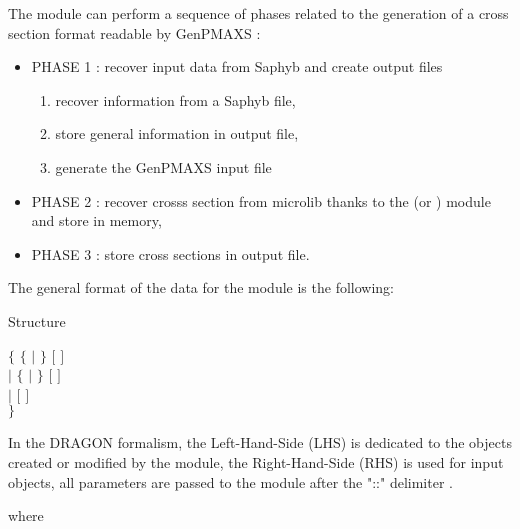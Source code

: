 The  module can perform a sequence of phases related to the generation of a cross section format readable by GenPMAXS :
\begin{itemize}
\item PHASE 1 : recover input data from Saphyb and create output files
\begin{enumerate}
\item recover information from a Saphyb file,
\item store general information in output file,
\item generate the GenPMAXS input file
\end{enumerate}
\item PHASE 2 : recover crosss section from microlib thanks to the  (or ) module and store in memory,
\item PHASE 3 : store cross sections in output file.
\end{itemize}


\noindent
The general format of the data for the  module is the following:

\begin{DataStructure}{Structure }

$\lbrace$
      $\lbrace$  $\vert$   $ \rbrace$ \moc{::}   $[$ $]$ \\
$\vert$
           $\lbrace$  $\vert$   $ \rbrace$  \moc{::}   $[$ $]$\\
$\vert$
               \moc{::}    $[$ $]$\\
$\rbrace$
\end{DataStructure}
In the DRAGON formalism, the Left-Hand-Side (LHS) is dedicated to the objects created or modified by the module, the Right-Hand-Side (RHS) is used for input objects, all parameters are passed to the module after the "::" delimiter .

\noindent where

